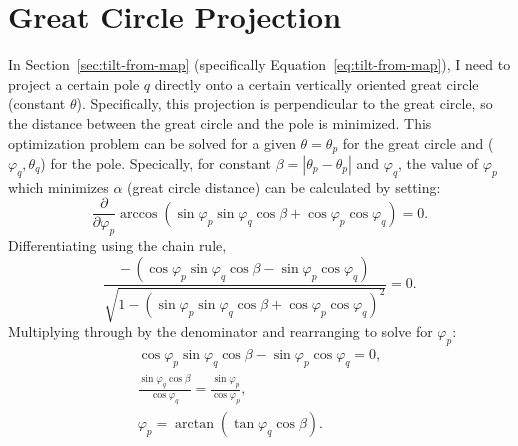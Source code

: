 \section{Great Circle Projection}\label{app:proj}
In Section~\ref{sec:tilt-from-map} (specifically Equation~\ref{eq:tilt-from-map}), I need to project a certain pole $q$ directly onto a certain vertically oriented great circle (constant $\theta$). Specifically, this projection is perpendicular to the great circle, so the distance between the great circle and the pole is minimized. This optimization problem can be solved for a given $\theta=\theta_p$ for the great circle and ($\varphi_q, \theta_q$) for the pole. Specically, for constant $\beta=|\theta_p-\theta_p|$ and $\varphi_q$, the value of $\varphi_p$ which minimizes $\alpha$ (great circle distance) can be calculated by setting:
\begin{equation}
    \frac{\partial}{\partial \varphi_p}
    \arccos\left(\sin\varphi_p\sin\varphi_q\cos\beta
    +\cos\varphi_p\cos\varphi_q\right)
    =0.
\end{equation}
Differentiating using the chain rule,
\begin{equation}
    \frac{-\,(\cos\varphi_p\sin\varphi_q
    \cos\beta-\sin\varphi_p\cos\varphi_q)}
    {\sqrt{1-{(\sin\varphi_p\sin\varphi_q\cos\beta
    +\cos\varphi_p\cos\varphi_q)}^2}}
    =0.
\end{equation}
Multiplying through by the denominator and rearranging to solve for $\varphi_p$:
\begin{gather}
    \cos\varphi_p\sin\varphi_q
    \cos\beta-\sin\varphi_p\cos\varphi_q
    =0,\nonumber\\
    \frac{\sin\varphi_q
    \cos\beta}
    {\cos\varphi_q}
    =\frac{\sin\varphi_p}{\cos\varphi_p},\nonumber\\
    \varphi_p
    =\arctan(\tan\varphi_q
    \cos\beta).
\end{gather}

